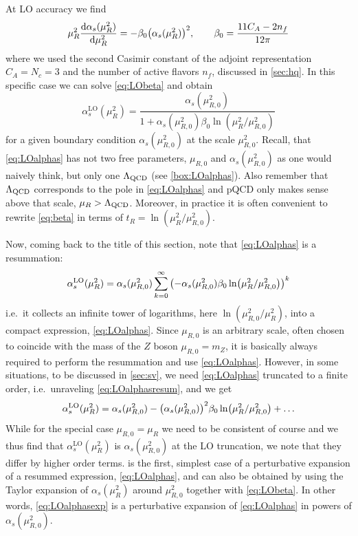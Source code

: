
At LO accuracy we find
\begin{equation}
    \mu_R^2 \dv{\alpha_s(\mu_R^2)}{\mu_R^2} = - \beta_0 \qty(\alpha_s(\mu_R^2))^2, \qquad \beta_0 = \frac{11 C_A - 2 n_f}{12\pi} \label{eq:LObeta}
\end{equation}
where we used the second Casimir constant of the adjoint representation $C_A = N_c = 3$ and the number of active flavors $n_f$, discussed in \cref{sec:hq}.
In this specific case we can solve \cref{eq:LObeta} and obtain
\begin{equation}
    \alpha_s^\text{LO}(\mu_R^2) = \frac{\alpha_s(\mu_{R,0}^2)}{1 + \alpha_s(\mu_{R,0}^2)\beta_0\ln(\mu_R^2/\mu_{R,0}^2)} \label{eq:LOalphas}
\end{equation}
for a given boundary condition $\alpha_s(\mu_{R,0}^2)$ at the scale $\mu_{R,0}^2$.
Recall, that \cref{eq:LOalphas} has not two free parameters, $\mu_{R,0}$ and $\alpha_s(\mu_{R,0}^2)$ as one would naively think, but only one $\Lambda_\text{QCD}$ (see \cref{box:LOalphas}).
Also remember that $\Lambda_\text{QCD}$ corresponds to the pole in \cref{eq:LOalphas} and pQCD only makes sense above that scale, $\mu_R > \Lambda_\text{QCD}$.
Moreover, in practice it is often convenient to rewrite \cref{eq:beta} in terms of $t_R = \ln(\mu_R^2/\mu_{R,0}^2)$.

Now, coming back to the title of this section, note that \cref{eq:LOalphas} is a resummation:
\begin{equation}
    \alpha_s^\text{LO}(\mu_R^2) = \alpha_s(\mu_{R,0}^2) \sum_{k=0}^\infty \qty(-\alpha_s(\mu_{R,0}^2)\beta_0\ln(\mu_R^2/\mu_{R,0}^2))^k \label{eq:LOalphasresum}
\end{equation}
i.e.\ it collects an infinite tower of logarithms, here $\ln(\mu_{R,0}^2/\mu_R^2)$, into a compact expression, \cref{eq:LOalphas}.
Since $\mu_{R,0}$ is an arbitrary scale, often chosen to coincide with the mass of the $Z$ boson $\mu_{R,0}=m_Z$, it is basically always required to perform the resummation and use \cref{eq:LOalphas}.
However, in some situations, to be discussed in \cref{sec:sv}, we need \cref{eq:LOalphas} truncated to a finite order, i.e.\ unraveling \cref{eq:LOalphasresum}, and we get
\begin{equation}
    \alpha_s^\text{LO}(\mu_R^2) = \alpha_s(\mu_{R,0}^2) - \qty(\alpha_s(\mu_{R,0}^2))^2\beta_0\ln(\mu_R^2/\mu_{R,0}^2) + \ldots \label{eq:LOalphasexp}
\end{equation}
While for the special case $\mu_{R,0} = \mu_R$ we need to be consistent of course and we thus find that $\alpha_s^\text{LO}(\mu_R^2)$ is $\alpha_s(\mu_{R,0}^2)$ at the LO truncation, we note that they differ by higher order terms.
 is the first, simplest case of a perturbative expansion of a resummed expression, \cref{eq:LOalphas}, and can also be obtained by using the Taylor expansion of $\alpha_s(\mu_R^2)$ around $\mu_{R,0}^2$ together with \cref{eq:LObeta}.
In other words, \cref{eq:LOalphasexp} is a perturbative expansion of \cref{eq:LOalphas} in powers of $\alpha_s(\mu_{R,0}^2)$.

